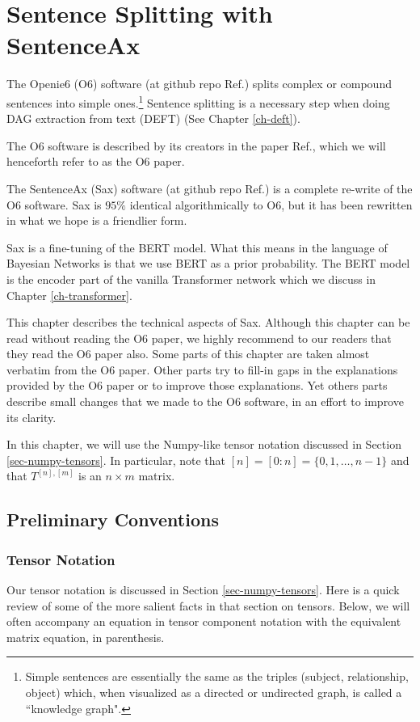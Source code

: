 \chapter{Sentence Splitting with SentenceAx}
\label{ch-sentence-ax}

The Openie6 (O6) software
(at github repo Ref.\cite{openie6-github})
splits complex or compound 
sentences into
simple ones.\footnote{Simple sentences are essentially
the same  as the triples (subject, relationship, object) which, when visualized as a directed or undirected graph,
is called a  ``knowledge graph".} Sentence splitting is a necessary step when doing 
DAG extraction from text (DEFT) (See Chapter \ref{ch-deft}).

The O6 software is described by its creators
 in the paper Ref.\cite{openie6-paper},
 which we will henceforth refer to as 
 the O6 paper.

The SentenceAx (Sax) software (at github repo Ref.\cite{sentence-ax-github}) is a complete re-write of 
the  O6 software.
Sax is $95\%$ identical algorithmically to O6, but it has been rewritten in what we hope is a friendlier form.
 

 Sax is a fine-tuning of the BERT model.
 What this means in the
 language of Bayesian
 Networks is that we use
 BERT as a prior
 probability.
 The BERT model is the encoder part of the
 vanilla Transformer network which
 we discuss in Chapter \ref{ch-transformer}.

 This chapter describes the technical
 aspects of Sax. Although this chapter
 can be read without reading the O6 paper, we highly recommend to
 our readers that they read the O6 paper also.
 Some parts of this chapter are taken almost verbatim
 from the O6 paper. Other parts try to fill-in gaps in the
 explanations provided by the O6 paper or to improve those explanations. Yet others parts describe small changes that we made to the O6 software, in an effort to improve its clarity.




 In this chapter, we
 will use the Numpy-like tensor notation
 discussed in Section
 \ref{sec-numpy-tensors}. In particular, note that $[n] = [0:n] = \{0, 1,\ldots, n-1\}$ and that $T^{[n], [m]}$ is an $n\times m$ matrix.

\section{Preliminary Conventions}

\subsection{Tensor Notation}
Our tensor notation is discussed in Section
\ref{sec-numpy-tensors}.
Here is a quick review
of some of the more salient
facts in that section on tensors.
Below, we will often accompany
  an equation in tensor
  component notation
  with the equivalent matrix equation,
  in parenthesis.
  

